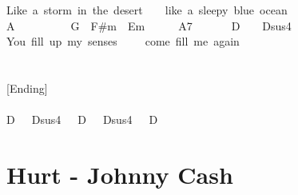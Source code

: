 \documentclass[]{book}
\let\stdsection\section
\renewcommand\section{\clearpage\stdsection}
\begin{document}
Like~a~storm~in~the~desert~~~~like~a~sleepy~blue~ocean\\
\hspace*{0.333em}\hspace*{0.333em}\hspace*{0.333em}\hspace*{0.333em}A~~~~~~~~~~G~~F\#m~~Em~~~~~~A7~~~~~~~D~~~~Dsus4\\
You~fill~up~my~senses~~~~~come~fill~me~again\\
~\\
~\\
{[}Ending{]}\\
~\\
D~~~Dsus4~~~D~~~Dsus4~~~D\\

\hypertarget{hurt---johnny-cash}{%
\section{Hurt - Johnny Cash}\label{hurt---johnny-cash}}
\end{document}
